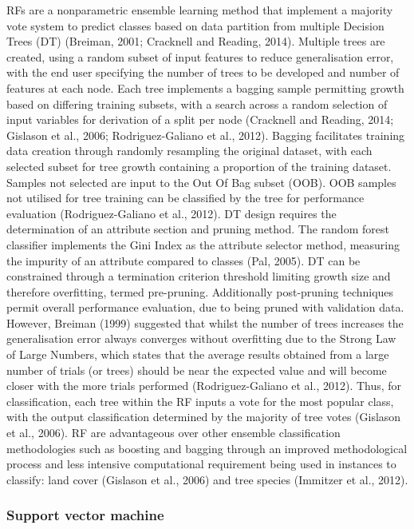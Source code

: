 \documentclass[]{book}
\begin{document}
RFs are a nonparametric ensemble learning method that implement a
majority vote system to predict classes based on data partition from
multiple Decision Trees (DT) (Breiman, 2001; Cracknell and Reading,
2014). Multiple trees are created, using a random subset of input
features to reduce generalisation error, with the end user specifying
the number of trees to be developed and number of features at each node.
Each tree implements a bagging sample permitting growth based on
differing training subsets, with a search across a random selection of
input variables for derivation of a split per node (Cracknell and
Reading, 2014; Gislason et al., 2006; Rodriguez-Galiano et al., 2012).
Bagging facilitates training data creation through randomly resampling
the original dataset, with each selected subset for tree growth
containing a proportion of the training dataset. Samples not selected
are input to the Out Of Bag subset (OOB). OOB samples not utilised for
tree training can be classified by the tree for performance evaluation
(Rodriguez-Galiano et al., 2012). DT design requires the determination
of an attribute section and pruning method. The random forest classifier
implements the Gini Index as the attribute selector method, measuring
the impurity of an attribute compared to classes (Pal, 2005). DT can be
constrained through a termination criterion threshold limiting growth
size and therefore overfitting, termed pre-pruning. Additionally
post-pruning techniques permit overall performance evaluation, due to
being pruned with validation data. However, Breiman (1999) suggested
that whilst the number of trees increases the generalisation error
always converges without overfitting due to the Strong Law of Large
Numbers, which states that the average results obtained from a large
number of trials (or trees) should be near the expected value and will
become closer with the more trials performed (Rodriguez-Galiano et al.,
2012). Thus, for classification, each tree within the RF inputs a vote
for the most popular class, with the output classification determined by
the majority of tree votes (Gislason et al., 2006). RF are advantageous
over other ensemble classification methodologies such as boosting and
bagging through an improved methodological process and less intensive
computational requirement being used in instances to classify: land
cover (Gislason et al., 2006) and tree species (Immitzer et al., 2012).

\subsubsection{Support vector machine}\label{support-vector-machine}
\end{document}
